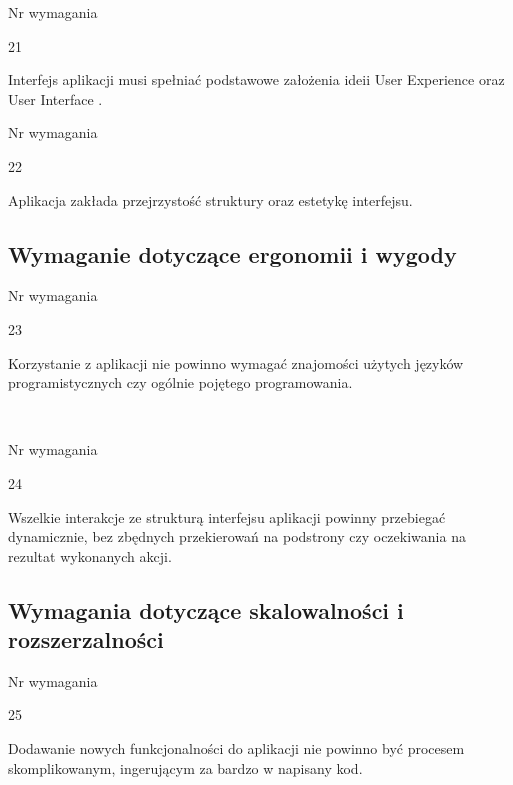 \documentclass[eng,printmode]{mgr}
\begin{document}
\begin{labeling}{Nr wymagania}
 \item [\textbf{Nr wymagania}:] 21
 \item [\textbf{Treść}:] Interfejs aplikacji musi spełniać podstawowe założenia ideii User Experience oraz User Interface \cite{Keyword_UserInterface}.
\end{labeling}

\begin{labeling}{Nr wymagania}
 \item [\textbf{Nr wymagania}:] 22
 \item [\textbf{Treść}:] Aplikacja zakłada przejrzystość struktury oraz estetykę interfejsu.
\end{labeling}

\subsection{Wymaganie dotyczące ergonomii i wygody}
\begin{labeling}{Nr wymagania}
 \item [\textbf{Nr wymagania}:] 23
 \item [\textbf{Treść}:] Korzystanie z aplikacji nie powinno wymagać znajomości użytych języków programistycznych czy ogólnie pojętego programowania.
\end{labeling} \ \\

\begin{labeling}{Nr wymagania}
 \item [\textbf{Nr wymagania}:] 24
 \item [\textbf{Treść}:] Wszelkie interakcje ze strukturą interfejsu aplikacji powinny przebiegać dynamicznie, bez zbędnych przekierowań na podstrony  czy oczekiwania na rezultat wykonanych akcji.
\end{labeling}

\subsection{Wymagania dotyczące skalowalności i rozszerzalności}

\begin{labeling}{Nr wymagania}
 \item [\textbf{Nr wymagania}:] 25
 \item [\textbf{Treść}:] Dodawanie nowych funkcjonalności do aplikacji nie powinno być procesem skomplikowanym, ingerującym za bardzo w napisany kod.
\end{labeling} \ \\
\end{document}
